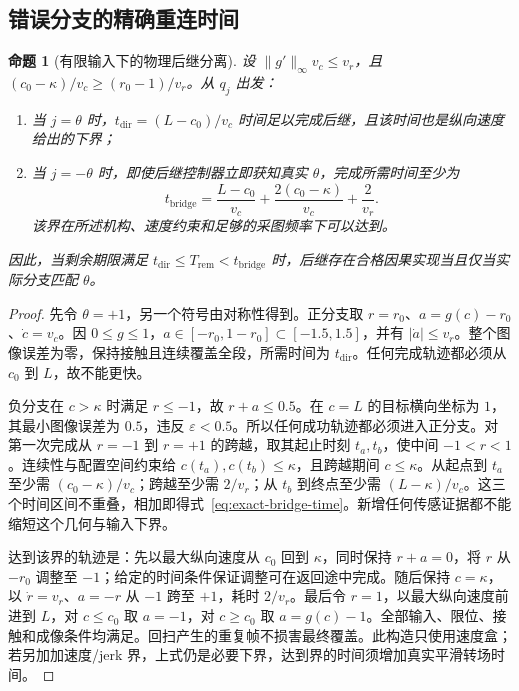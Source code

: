\documentclass[UTF8,fontset=fandol,zihao=5,a4paper]{ctexart}
\newtheorem{proposition}[theorem]{命题}
\theoremstyle{definition}
\theoremstyle{remark}\newtheorem{remark}[theorem]{说明}
\numberwithin{equation}{section}
\begin{document}
\subsection{错误分支的精确重连时间}

\begin{proposition}[有限输入下的物理后继分离]
\label{prop:physical-branch-time}
设 \(\|g'\|_\infty v_c\le v_r\)，且
\((c_0-\kappa)/v_c\ge(r_0-1)/v_r\)。从 \(q_j\) 出发：
\begin{enumerate}
\item 当 \(j=\theta\) 时，\(t_{\mathrm{dir}}=(L-c_0)/v_c\) 时间足以完成后继，且该时间也是纵向速度给出的下界；
\item 当 \(j=-\theta\) 时，即使后继控制器立即获知真实 \(\theta\)，完成所需时间至少为
\begin{equation}
t_{\mathrm{bridge}}
=\frac{L-c_0}{v_c}
+\frac{2(c_0-\kappa)}{v_c}
+\frac{2}{v_r}.
\label{eq:exact-bridge-time}
\end{equation}
该界在所述机构、速度约束和足够的采图频率下可以达到。
\end{enumerate}
因此，当剩余期限满足
\(t_{\mathrm{dir}}\le T_{\mathrm{rem}}<t_{\mathrm{bridge}}\) 时，后继存在合格因果实现当且仅当实际分支匹配 \(\theta\)。
\end{proposition}
\begin{proof}
先令 \(\theta=+1\)，另一个符号由对称性得到。正分支取 \(r=r_0\)、\(a=g(c)-r_0\)、\(\dot c=v_c\)。因 \(0\le g\le1\)，\(a\in[-r_0,1-r_0]\subset[-1.5,1.5]\)，并有 \(|\dot a|\le v_r\)。整个图像误差为零，保持接触且连续覆盖全段，所需时间为 \(t_{\mathrm{dir}}\)。任何完成轨迹都必须从 \(c_0\) 到 \(L\)，故不能更快。

负分支在 \(c>\kappa\) 时满足 \(r\le-1\)，故 \(r+a\le0.5\)。在 \(c=L\) 的目标横向坐标为 \(1\)，其最小图像误差为 \(0.5\)，违反 \(\varepsilon<0.5\)。所以任何成功轨迹都必须进入正分支。对第一次完成从 \(r=-1\) 到 \(r=+1\) 的跨越，取其起止时刻 \(t_a,t_b\)，使中间 \(-1<r<1\)。连续性与配置空间约束给 \(c(t_a),c(t_b)\le\kappa\)，且跨越期间 \(c\le\kappa\)。从起点到 \(t_a\) 至少需 \((c_0-\kappa)/v_c\)；跨越至少需 \(2/v_r\)；从 \(t_b\) 到终点至少需 \((L-\kappa)/v_c\)。这三个时间区间不重叠，相加即得式~\eqref{eq:exact-bridge-time}。新增任何传感证据都不能缩短这个几何与输入下界。

达到该界的轨迹是：先以最大纵向速度从 \(c_0\) 回到 \(\kappa\)，同时保持 \(r+a=0\)，将 \(r\) 从 \(-r_0\) 调整至 \(-1\)；给定的时间条件保证调整可在返回途中完成。随后保持 \(c=\kappa\)，以 \(\dot r=v_r\)、\(a=-r\) 从 \(-1\) 跨至 \(+1\)，耗时 \(2/v_r\)。最后令 \(r=1\)，以最大纵向速度前进到 \(L\)，对 \(c\le c_0\) 取 \(a=-1\)，对 \(c\ge c_0\) 取 \(a=g(c)-1\)。全部输入、限位、接触和成像条件均满足。回扫产生的重复帧不损害最终覆盖。此构造只使用速度盒；若另加加速度/jerk 界，上式仍是必要下界，达到界的时间须增加真实平滑转场时间。
\end{proof}
\end{document}
